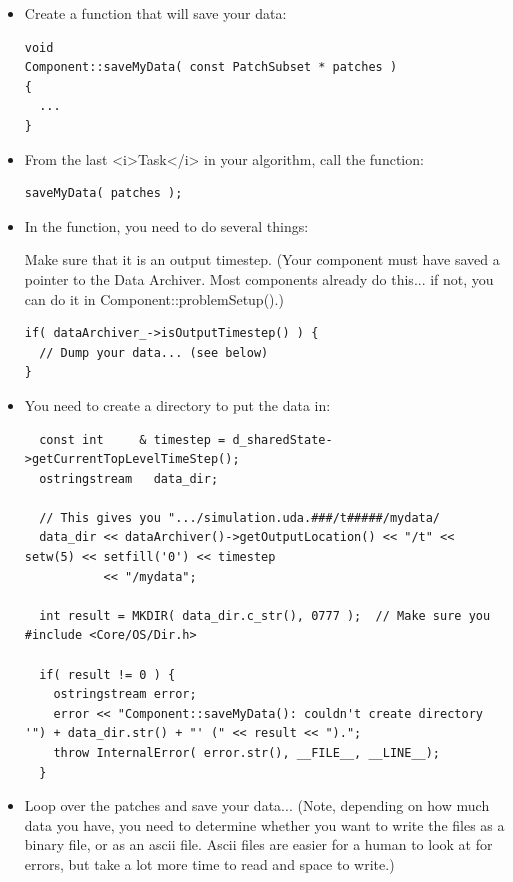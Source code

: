 \documentclass[12pt]{report}
\begin{document}
\begin{itemize}
\item Create a function that will save your data:

\begin{Verbatim}
void
Component::saveMyData( const PatchSubset * patches )
{
  ...
}
\end{Verbatim}

\item From the last <i>Task</i> in your algorithm, call the function:

\begin{Verbatim}
saveMyData( patches );
\end{Verbatim}

\item In the function, you need to do several things:

  Make sure that it is an output timestep.  (Your component must have
  saved a pointer to the Data Archiver.  Most components already do
  this... if not, you can do it in Component::problemSetup().)

\begin{Verbatim}
if( dataArchiver_->isOutputTimestep() ) {
  // Dump your data... (see below)
}
\end{Verbatim}

\item You need to create a directory to put the data in:

\begin{Verbatim}
  const int     & timestep = d_sharedState->getCurrentTopLevelTimeStep();
  ostringstream   data_dir;

  // This gives you ".../simulation.uda.###/t#####/mydata/
  data_dir << dataArchiver()->getOutputLocation() << "/t" << setw(5) << setfill('0') << timestep
           << "/mydata";
  
  int result = MKDIR( data_dir.c_str(), 0777 );  // Make sure you #include <Core/OS/Dir.h>

  if( result != 0 ) {
    ostringstream error;
    error << "Component::saveMyData(): couldn't create directory '") + data_dir.str() + "' (" << result << ").";
    throw InternalError( error.str(), __FILE__, __LINE__);        
  }
\end{Verbatim}

\item Loop over the patches and save your data... (Note, depending on
  how much data you have, you need to determine whether you want to
  write the files as a binary file, or as an ascii file.  Ascii files
  are easier for a human to look at for errors, but take a lot more
  time to read and space to write.)


\end{itemize}
\end{document}
